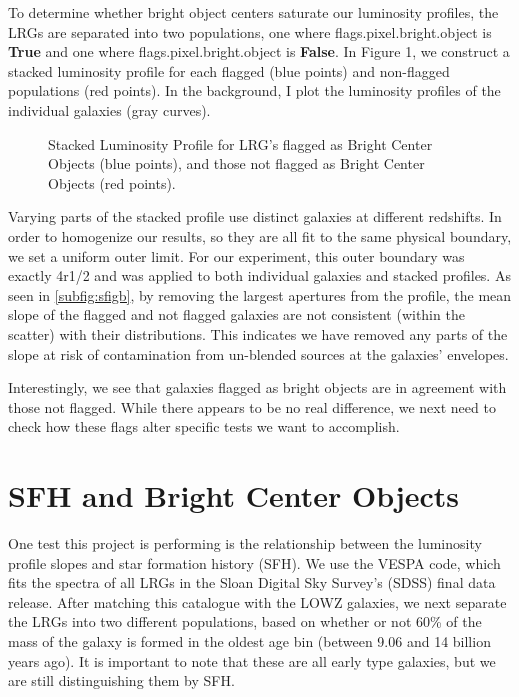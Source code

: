 \documentclass{article}
\begin{document}
To determine whether bright object centers saturate our luminosity profiles, the LRGs are separated into two populations, one where flags.pixel.bright.object is \textbf{True} and one where flags.pixel.bright.object is \textbf{False}. In Figure 1, we construct a stacked luminosity profile for each flagged (blue points) and non-flagged populations (red points). In the background, I plot the luminosity profiles of the individual galaxies (gray curves).

\begin{figure}[t!]
\hfill
{}
 \caption{Stacked Luminosity Profile for LRG's flagged as Bright Center Objects (blue points), and those not flagged as Bright Center Objects (red points). }
\label{fig:mesh1}
\end{figure}


Varying parts of the stacked profile use distinct galaxies at different redshifts. In order to homogenize our results, so they are all fit to the same physical boundary, we set a uniform outer limit. For our experiment, this outer boundary was exactly 4r1/2 and was applied to both individual galaxies and stacked profiles. As seen in \ref{subfig:sfigb}, by removing the largest apertures from the profile, the mean slope of the flagged and not flagged galaxies are not consistent (within the scatter) with their distributions. This indicates we have removed any parts of the slope at risk of contamination from un-blended sources at the galaxies' envelopes. 

Interestingly, we see that galaxies flagged as bright objects are in agreement with those not flagged. While there appears to be no real difference, we next need to check how these flags alter specific tests we want to accomplish.

\section{SFH and Bright Center Objects}
One test this project is performing is the relationship between the luminosity profile slopes and star formation history (SFH). We use the VESPA code, which fits the spectra of all LRGs in the Sloan Digital Sky Survey's (SDSS) final data release. After matching this catalogue with the LOWZ galaxies, we next separate the LRGs into two different populations, based on whether or not 60\% of the mass of the galaxy is formed in the oldest age bin (between 9.06 and 14 billion years ago). It is important to note that these are all early type galaxies, but we are still distinguishing them by SFH.
\end{document}
